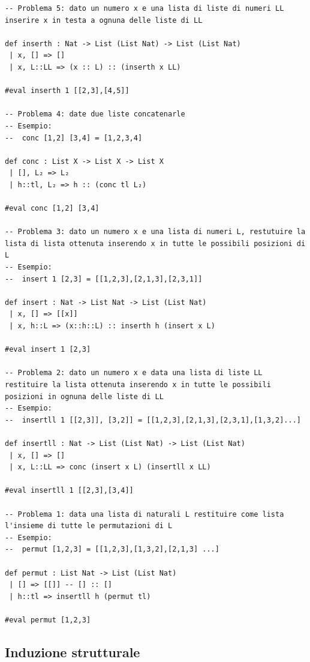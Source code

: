\documentclass[
  a4paper,
]{article}
\begin{document}
\begin{examplebox}

\begin{lstlisting}
-- Problema 5: dato un numero x e una lista di liste di numeri LL inserire x in testa a ognuna delle liste di LL

def inserth : Nat -> List (List Nat) -> List (List Nat)
 | x, [] => []
 | x, L::LL => (x :: L) :: (inserth x LL)

#eval inserth 1 [[2,3],[4,5]]

-- Problema 4: date due liste concatenarle
-- Esempio:
--  conc [1,2] [3,4] = [1,2,3,4]

def conc : List X -> List X -> List X
 | [], L₂ => L₂
 | h::tl, L₂ => h :: (conc tl L₂)

#eval conc [1,2] [3,4]

-- Problema 3: dato un numero x e una lista di numeri L, restutuire la lista di lista ottenuta inserendo x in tutte le possibili posizioni di L
-- Esempio:
--  insert 1 [2,3] = [[1,2,3],[2,1,3],[2,3,1]]

def insert : Nat -> List Nat -> List (List Nat)
 | x, [] => [[x]]
 | x, h::L => (x::h::L) :: inserth h (insert x L)

#eval insert 1 [2,3]

-- Problema 2: dato un numero x e data una lista di liste LL restituire la lista ottenuta inserendo x in tutte le possibili posizioni in ognuna delle liste di LL
-- Esempio:
--  insertll 1 [[2,3]], [3,2]] = [[1,2,3],[2,1,3],[2,3,1],[1,3,2]...]

def insertll : Nat -> List (List Nat) -> List (List Nat)
 | x, [] => []
 | x, L::LL => conc (insert x L) (insertll x LL)

#eval insertll 1 [[2,3],[3,4]]

-- Problema 1: data una lista di naturali L restituire come lista l'insieme di tutte le permutazioni di L
-- Esempio: 
--  permut [1,2,3] = [[1,2,3],[1,3,2],[2,1,3] ...]

def permut : List Nat -> List (List Nat)
 | [] => [[]] -- [] :: []
 | h::tl => insertll h (permut tl)

#eval permut [1,2,3]
\end{lstlisting}

\end{examplebox}

\hypertarget{induzione-strutturale}{%
\subsection{Induzione strutturale}\label{induzione-strutturale}}
\end{document}

